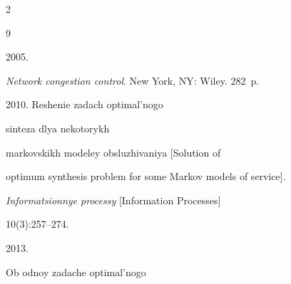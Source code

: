 


























  \begin{multicols}{2}





\renewcommand{\bibname}{\protect\rmfamily References}







{\small\frenchspacing


 {%




 \begin{thebibliography}{9}




 2005. 


\textit{Network congestion control}. New York, NY: Wiley. 282~p.




 2010. Reshenie zadach optimal'nogo 


sinteza dlya nekotorykh 


markovskikh modeley obsluzhivaniya [Solution of 


optimum synthesis problem for some Markov models of service]. 


\textit{Informatsionnye processy} [Information Processes] 


10(3):257--274.




 2013. 


Ob odnoy zadache optimal'nogo 



\end{thebibliography}}}
\end{multicols}
